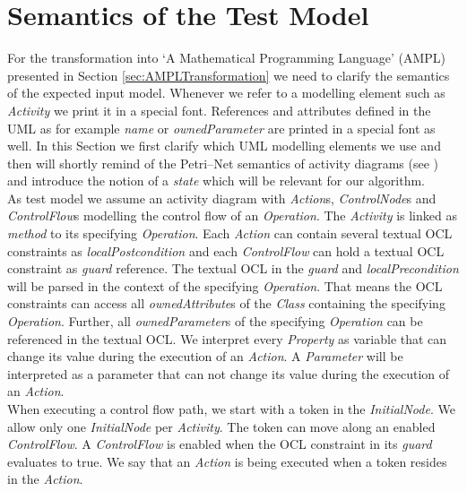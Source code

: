 \documentclass[runningheads,a4paper]{llncs}%
\newcommand{\UMLType}[1]{\textsf{\textit{#1}}} %
\newcommand{\UMLReference}[1]{\textsf{\textit{#1}}} %
\begin{document}
\section{Semantics of the Test Model}%
\label{sec:TestModel}%
For the transformation into `A Mathematical Programming Language' (AMPL) presented in Section \ref{sec:AMPLTransformation} we need to clarify the semantics of the expected input model. Whenever we refer to a modelling element such as \UMLType{Activity} we print it in a special font. References and attributes defined in the UML as for example \UMLReference{name} or \UMLReference{ownedParameter} are printed in a special font as well. In this Section we first clarify which UML modelling elements we use and then will shortly remind of the Petri--Net semantics of activity diagrams (see \cite{UML23Superstructure}) and introduce the notion of a \emph{state} which will be relevant for our algorithm.\\%
As test model we assume an activity diagram with \UMLType{Action}s, \UMLType{ControlNode}s and \UMLType{ControlFlow}s modelling the control flow of an \UMLType{Operation}. The \UMLType{Activity} is linked as \UMLReference{method} to its specifying \UMLType{Operation}. Each \UMLType{Action} can contain several %
textual OCL constraints as \UMLReference{localPostcondition} and each \UMLType{ControlFlow} can hold a textual OCL constraint as %
\UMLReference{guard} reference. The textual OCL in the \UMLReference{guard} and \UMLReference{localPrecondition} will be parsed in the context of the specifying \UMLType{Operation}. That means the OCL constraints can access all \UMLReference{ownedAttribute}s %
of the \UMLType{Class} containing the specifying \UMLType{Operation}. Further, all \UMLReference{ownedParameter}s of the specifying \UMLType{Operation} can be referenced in the textual OCL. We interpret every \UMLType{Property} as variable that can change its value during the execution of an \UMLType{Action}. A \UMLType{Parameter} will be interpreted as a parameter that can not change its value during the execution of an \UMLType{Action}.\\%
When executing a control flow path, we start with a token in the \UMLType{InitialNode}. We allow only one \UMLType{InitialNode} per \UMLType{Activity}. The token can move along an enabled \UMLType{ControlFlow}. A \UMLType{ControlFlow} is enabled when the OCL constraint in its \UMLReference{guard} evaluates to true. We say that an \UMLType{Action} is being executed when a token resides in the \UMLType{Action}.\\
\end{document}
